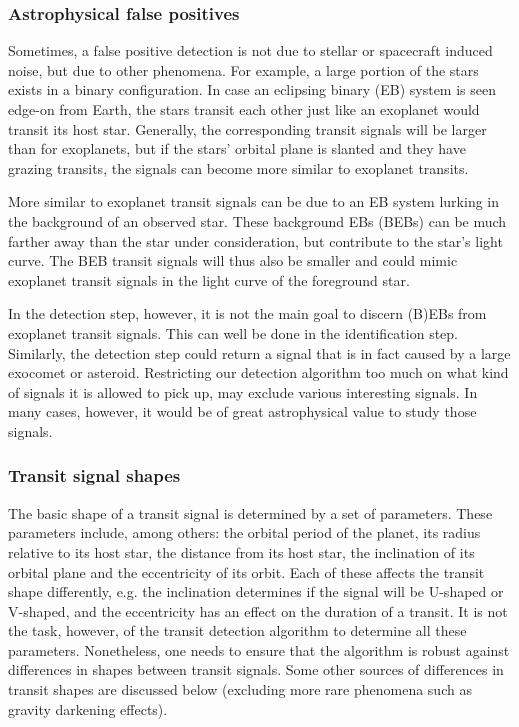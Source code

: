\subsubsection{Astrophysical false positives}

Sometimes, a false positive detection is not due to stellar or spacecraft induced noise, but due to other phenomena. For example, a large portion of the stars exists in a binary configuration. In case an eclipsing binary (EB) system is seen edge-on from Earth, the stars transit each other just like an exoplanet would transit its host star. Generally, the corresponding transit signals will be larger than for exoplanets, but if the stars' orbital plane is slanted and they have grazing transits, the signals can become more similar to exoplanet transits. 

More similar to exoplanet transit signals can be due to an EB system lurking in the background of an observed star. These background EBs (BEBs) can be much farther away than the star under consideration, but contribute to the star's light curve. The BEB transit signals will thus also be smaller and could mimic exoplanet transit signals in the light curve of the foreground star.

In the detection step, however, it is not the main goal to discern (B)EBs from exoplanet transit signals. This can well be done in the identification step. Similarly, the detection step could return a signal that is in fact 
caused by a large exocomet or asteroid. Restricting our detection algorithm too much on what kind of signals it is allowed to pick up, may exclude various interesting signals. In many cases, however, it would be of great astrophysical value to study those signals.

\subsubsection{Transit signal shapes}

The basic shape of a transit signal is determined by a set of parameters. These parameters include, among others: the orbital period of the planet, its radius relative to its host star, the distance from its host star, the inclination of its orbital plane and the eccentricity of its orbit. Each of these affects the transit shape differently, e.g. the inclination determines if the signal will be U-shaped or V-shaped, and the eccentricity has an effect on the duration of a transit. It is not the task, however, of the transit detection algorithm to determine all these parameters. Nonetheless, one needs to ensure that the algorithm is robust against differences in shapes between transit signals. Some other sources of differences in transit shapes are discussed below (excluding more rare phenomena such as gravity darkening effects).

